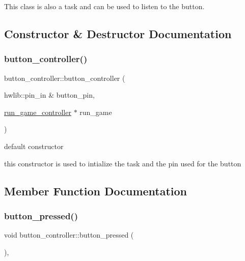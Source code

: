 This class is also a task and can be used to listen to the button. 

\subsection{Constructor \& Destructor Documentation}
\hypertarget{classbutton__controller_a01cbbc0eed4933a6fe3fbf3ed565baf8}{}\label{classbutton__controller_a01cbbc0eed4933a6fe3fbf3ed565baf8} 
\subsubsection{\texorpdfstring{button\+\_\+controller()}{button\_controller()}}
{\footnotesize\ttfamily button\+\_\+controller\+::button\+\_\+controller (\begin{DoxyParamCaption}\item[{hwlib\+::pin\+\_\+in \&}]{button\+\_\+pin,  }\item[{\hyperlink{classrun__game__controller}{run\+\_\+game\+\_\+controller} $\ast$}]{run\+\_\+game }\end{DoxyParamCaption})}



default constructor 

this constructor is used to intialize the task and the pin used for the button 

\subsection{Member Function Documentation}
\hypertarget{classbutton__controller_ac89e1b4894ecf3762958c97e2558d31b}{}\label{classbutton__controller_ac89e1b4894ecf3762958c97e2558d31b} 
\subsubsection{\texorpdfstring{button\+\_\+pressed()}{button\_pressed()}}
{\footnotesize\ttfamily void button\+\_\+controller\+::button\+\_\+pressed (\begin{DoxyParamCaption}{ }\end{DoxyParamCaption})\hspace{0.3cm}{\ttfamily [override]}, {\ttfamily [virtual]}}



